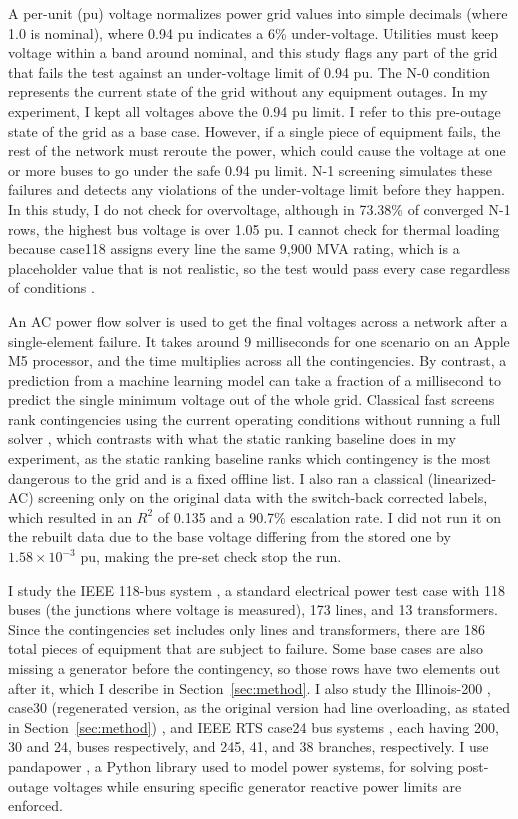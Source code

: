 \documentclass[12pt]{article}
\begin{document}
A per-unit (pu) voltage normalizes power grid values into simple decimals (where 1.0 is nominal), where 0.94 pu indicates a 6\% under-voltage. Utilities must keep voltage within a band around nominal, and this study flags any part of the grid that fails the test against an under-voltage limit of 0.94 pu. The N-0 condition represents the current state of the grid without any equipment outages. In my experiment, I kept all voltages above the 0.94 pu limit. I refer to this pre-outage state of the grid as a base case. However, if a single piece of equipment fails, the rest of the network must reroute the power, which could cause the voltage at one or more buses to go under the safe 0.94 pu limit. N-1 screening simulates these failures and detects any violations of the under-voltage limit before they happen. In this study, I do not check for overvoltage, although in 73.38\% of converged N-1 rows, the highest bus voltage is over 1.05 pu. I cannot check for thermal loading because case118 assigns every line the same 9,900 MVA rating, which is a placeholder value that is not realistic, so the test would pass every case regardless of conditions \cite{pypower}.

An AC power flow solver is used to get the final voltages across a network after a single-element failure. It takes around 9 milliseconds for one scenario on an Apple M5 processor, and the time multiplies across all the contingencies. By contrast, a prediction from a machine learning model can take a fraction of a millisecond to predict the single minimum voltage out of the whole grid. Classical fast screens rank contingencies using the current operating conditions without running a full solver \cite{ejebe1979}, which contrasts with what the static ranking baseline does in my experiment, as the static ranking baseline ranks which contingency is the most dangerous to the grid and is a fixed offline list. I also ran a classical (linearized-AC) screening only on the original data with the switch-back corrected labels, which resulted in an ${R}^2$ of 0.135 and a 90.7\% escalation rate. I did not run it on the rebuilt data due to the base voltage differing from the stored one by $1.58 \times 10^{-3}$ pu, making the pre-set check stop the run.

I study the IEEE 118-bus system \cite{case118}, a standard electrical power test case with 118 buses (the junctions where voltage is measured), 173 lines, and 13 transformers. Since the contingencies set includes only lines and transformers, there are 186 total pieces of equipment that are subject to failure. Some base cases are also missing a generator before the contingency, so those rows have two elements out after it, which I describe in Section~\ref{sec:method}. I also study the Illinois-200 \cite{illinois200}, case30 (regenerated version, as the original version had line overloading, as stated in Section~\ref{sec:method}) \cite{case30}, and IEEE RTS case24 bus systems \cite{case24}, each having 200, 30 and 24, buses respectively, and 245, 41, and 38 branches, respectively. I use pandapower \cite{pandapower}, a Python library used to model power systems, for solving post-outage voltages while ensuring specific generator reactive power limits are enforced.
\end{document}
